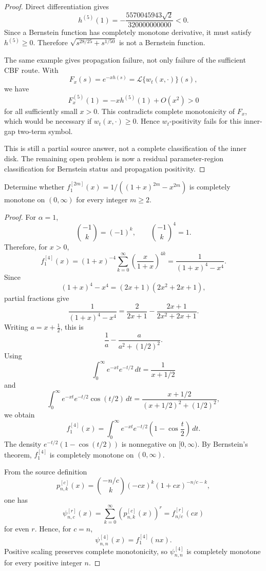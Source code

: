 \begin{proof}
Direct differentiation gives
\[
h^{(5)}(1)
=-\frac{5570045943\sqrt2}{320000000000}<0.
\]
Since a Bernstein function has completely monotone derivative, it must satisfy \(h^{(5)}\ge0\). Therefore \(\sqrt{s^{28/25}+s^{1/50}}\) is not a Bernstein function.

The same example gives propagation failure, not only failure of the sufficient CBF route. With
\[
F_x(s)=e^{-xh(s)}=\mathcal L\{w_t(x,\cdot)\}(s),
\]
we have
\[
F_x^{(5)}(1)=-x h^{(5)}(1)+O(x^2)>0
\]
for all sufficiently small \(x>0\). This contradicts complete monotonicity of \(F_x\), which would be necessary if \(w_t(x,\cdot)\ge0\). Hence \(w_t\)-positivity fails for this inner-gap two-term symbol.

This is still a partial source answer, not a complete classification of the inner disk. The remaining open problem is now a residual parameter-region classification for Bernstein status and propagation positivity.
\end{proof}

\begin{proposition}
\label{res:baskakov-alpha1-even-r-frontier-open}
Determine whether \(f^{[2m]}_1(x)=1/((1+x)^{2m}-x^{2m})\) is completely monotone on \((0,\infty)\) for every integer \(m\ge2\).
\end{proposition}
\begin{proof}
For \(\alpha=1\),
\[
\binom{-1}{k}=(-1)^k,
\qquad
\binom{-1}{k}^{4}=1.
\]
Therefore, for \(x>0\),
\[
f^{[4]}_1(x)
=(1+x)^{-4}\sum_{k=0}^{\infty}
\left(\frac{x}{1+x}\right)^{4k}
=\frac{1}{(1+x)^4-x^4}.
\]
Since
\[
(1+x)^4-x^4=(2x+1)(2x^2+2x+1),
\]
partial fractions give
\[
\frac{1}{(1+x)^4-x^4}
=\frac{2}{2x+1}-\frac{2x+1}{2x^2+2x+1}.
\]
Writing \(a=x+\frac12\), this is
\[
\frac{1}{a}-\frac{a}{a^2+(1/2)^2}.
\]
Using
\[
\int_0^\infty e^{-xt}e^{-t/2}\,dt=\frac{1}{x+1/2}
\]
and
\[
\int_0^\infty e^{-xt}e^{-t/2}\cos(t/2)\,dt
=\frac{x+1/2}{(x+1/2)^2+(1/2)^2},
\]
we obtain
\[
f^{[4]}_1(x)
=\int_0^\infty e^{-xt}e^{-t/2}\left(1-\cos\frac{t}{2}\right)\,dt.
\]
The density \(e^{-t/2}(1-\cos(t/2))\) is nonnegative on \([0,\infty)\). By Bernstein's theorem, \(f^{[4]}_1\) is completely monotone on \((0,\infty)\).

From the source definition
\[
p^{[c]}_{n,k}(x)=\binom{-n/c}{k}(-cx)^k(1+cx)^{-n/c-k},
\]
one has
\[
\psi^{[r]}_{n,c}(x)=\sum_{k=0}^{\infty}\left(p^{[c]}_{n,k}(x)\right)^r
=f^{[r]}_{n/c}(cx)
\]
for even \(r\). Hence, for \(c=n\),
\[
\psi^{[4]}_{n,n}(x)=f^{[4]}_1(nx).
\]
Positive scaling preserves complete monotonicity, so \(\psi^{[4]}_{n,n}\) is completely monotone for every positive integer \(n\).
\end{proof}

